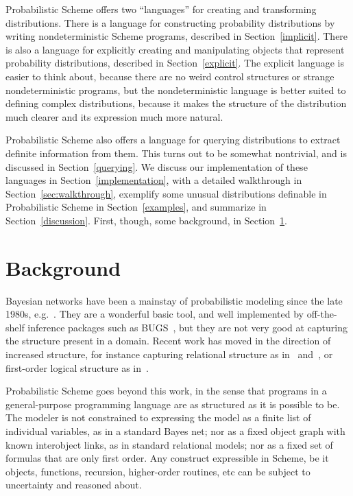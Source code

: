 \documentclass[10pt]{sigplanconf}
\begin{document}
Probabilistic Scheme offers two ``languages'' for creating and
transforming distributions.  There is a language for constructing
probability distributions by writing nondeterministic
Scheme programs, described in Section~\ref{implicit}.
There is also a language for explicitly
creating and manipulating objects that represent probability
distributions, described in Section~\ref{explicit}.  
The explicit language is easier to think about,
because there are no weird control structures or strange
nondeterministic programs, but the nondeterministic language is better suited
to defining complex distributions, because it makes the structure of
the distribution much clearer and its expression much more natural.

Probabilistic Scheme also offers a language for querying distributions
to extract definite information from them.  This turns out to be
somewhat nontrivial, and is discussed in Section~\ref{querying}.  We
discuss our implementation of these languages in
Section~\ref{implementation}, with a detailed walkthrough in 
Section~\ref{sec:walkthrough}, exemplify some unusual distributions
definable in Probabilistic Scheme
in Section~\ref{examples}, and summarize
in Section~\ref{discussion}.  First, though, some background,
in Section~\ref{background}.

\section{Background}
\label{background}

Bayesian networks have been a mainstay of probabilistic modeling since
the late 1980s,
e.g.~\cite{russell1995aim}.  They are a wonderful basic tool, and well
implemented by off-the-shelf inference packages such as
BUGS~\cite{spiegelhalter1994bbi}, but they are not very good at
capturing the structure present in a domain.  Recent work has moved in
the direction of increased structure, for instance capturing
relational structure as in~\cite{koller1998pfb}
and~\cite{friedman1999lpr}, or first-order logical structure as
in~\cite{milch2005bpm}.  

Probabilistic Scheme goes beyond this work, in the sense that programs
in a general-purpose programming language are as structured as it is
possible to be.  The modeler is not constrained to expressing the
model as a finite list of individual variables, as in a standard Bayes
net; nor as a fixed object graph with known interobject links, as in
standard relational models; nor as a fixed set of formulas that are
only first order.  Any construct expressible in Scheme, be it objects,
functions, recursion, higher-order routines, etc can be subject to
uncertainty and reasoned about.
\end{document}
